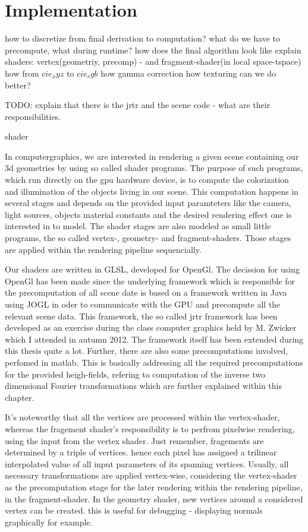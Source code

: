 \section{Implementation}

how to discretize from final derivation to computation?
what do we have to precompute, what during runtime?
how does the final algorithm look like
explain shaders: vertex(geometriy, precomp) - and fragment-shader(in local space-tspace)
how from $cie_xyz$ to $cie_rgb$
how gamma correction
how texturing 
can we do better?

TODO: explain that there is the jrtr and the scene code - what are their responsibilities.

shader

In computergraphics, we are interested in rendering a given scene containing our 3d geometries by using so called shader programs. 
The purpose of such programs, which run directly on the gpu hardware device, is to compute the colorization and illumination of the objects living in our scene. This computation happens in several stages and depends on the provided input paramteters like the camera, light sources, objects material constants and the desired rendering effect one is interested in to model. The shader stages are also modeled as small little programs, the so called vertex-, geometry- and fragment-shaders. Those stages are applied within the rendering pipeline sequencially. 

Our shaders are written in GLSL, developed for OpenGl. The decission for using OpenGl has been made since the underlying framework which is responsible for the precomputation of all scene date is based on a framework written in Java using JOGL in oder to communicate with the GPU and precompute all the relevant scene data. This framework, the so called jrtr framework has been developed as an exercise during the class computer graphics held by M. Zwicker which I attended in autumn 2012. The framework itself has been extended during this thesis quite a lot. Further, there are also some precomputations involved, perfomed in matlab. This is basically addressing all the required precomputations for the provided heigh-fields, refering to computation of the inverse two dimensional Fourier transformations which are further explained within this chapter.  

It's noteworthy that all the vertices are processed within the vertex-shader, whereas the fragement shader's responsibility is to perfrom pixelwise rendering, using the input from the vertex shader. Just remember, fragements are determined by a triple of vertices. hence each pixel has assigned a trilinear interpolated value of all input parameters of its spanning vertices.
Usually, all necessary transformations are applied vertex-wise, considering the vertex-shader as the precomputation stage for the later rendering within the rendering pipeline, in the fragment-shader. In the geometry shader, new vertices around a considered vertex can be created. this is useful for debugging - displaying normals graphically for example.

